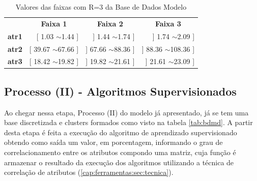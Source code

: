 \begin{table}[]
\centering
\caption{Valores das faixas com R=3 da Base de Dados Modelo}
\label{tab:faixas}
\begin{tabular}{lrrr}
\rowcolor[HTML]{C0C0C0} 
                                     & \multicolumn{1}{c}{\cellcolor[HTML]{C0C0C0}\textbf{Faixa 1}} & \multicolumn{1}{c}{\cellcolor[HTML]{C0C0C0}\textbf{Faixa 2}} & \multicolumn{1}{c}{\cellcolor[HTML]{C0C0C0}\textbf{Faixa 3}} \\
\rowcolor[HTML]{FFFFFF} 
{\color[HTML]{333333} \textbf{atr1}} & {[} 1.03 $\sim$1.44 {]}                                      & {]} 1.44 $\sim$1.74 {]}                                      & {]} 1.74 $\sim$2.09 {]}                                      \\
\rowcolor[HTML]{EFEFEF} 
{\color[HTML]{000000} \textbf{atr2}} & {\color[HTML]{000000} {[} 39.67 $\sim$67.66 {]}}             & {\color[HTML]{000000} {]} 67.66 $\sim$88.36 {]}}             & {\color[HTML]{000000} {]} 88.36 $\sim$108.36 {]}}            \\
\rowcolor[HTML]{FFFFFF} 
\textbf{atr3}                        & {[} 18.42 $\sim$19.82 {]}                                    & {]} 19.82 $\sim$21.61 {]}                                    & {]} 21.61 $\sim$23.09 {]}                                   
\end{tabular}
\end{table}



\subsection{Processo (II) - Algoritmos Supervisionados}\label{cap:ferramentas:ssec:algsuper}

Ao chegar nessa etapa, Processo (II) do modelo já apresentado, já se tem uma base discretizada e clusters formados como visto na tabela \ref{tab:bdmd}. A partir desta etapa é feita a execução do algoritmo de aprendizado supervisionado obtendo como saída um valor, em porcentagem, informando o grau de correlacionamento entre os atributos compondo uma matriz, cuja função é armazenar o resultado da execução dos algoritmos utilizando a técnica de correlação de atributos (\ref{cap:ferramentas:sec:tecnica}). 


